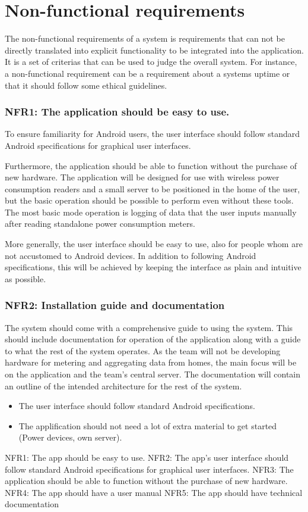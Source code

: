 \section{Non-functional requirements}
The non-functional requirements of a system is requirements that can not be directly translated into explicit functionality to be integrated into the application. It is a set of criterias that can be used to judge the overall system. For instance, a non-functional requirement can be a requirement about a systems uptime or that it should follow some ethical guidelines. 

\subsubsection{NFR1: The application should be easy to use.}
To ensure familiarity for Android users, the user interface should follow standard Android specifications for graphical user interfaces.
 
Furthermore, the application should be able to function without the purchase of new hardware. The application will be designed for use with wireless power consumption readers and a small server to be positioned in the home of the user, but the basic operation should be possible to perform even without these tools. The most basic mode operation is logging of data that 
the user inputs manually after reading standalone power consumption meters.
 
More generally, the user interface should be easy to use, also for people whom are not accustomed to Android devices. In 
addition to following Android specifications, this will be achieved by keeping the interface as plain and intuitive as possible.

\subsubsection{NFR2: Installation guide and documentation}
The system should come with a comprehensive guide to using the system. This should include documentation for operation of the
application along with a guide to what the rest of the system operates. As the team will not be developing hardware for metering and 
aggregating data from homes, the main focus will be on the application and the team's central server. The documentation will contain an outline 
of the intended architecture for the rest of the system.


\begin{itemize}
\item The user interface should follow standard Android specifications. 
\item The applification should not need a lot of extra material to get started (Power devices, own server).
\end{itemize}


NFR1: The app should be easy to use.
NFR2: The app’s user interface should follow standard Android specifications for graphical user interfaces. 
NFR3: The application should be able to function without the purchase of new hardware. 
NFR4: The app should have a user manual
NFR5: The app should have technical documentation
